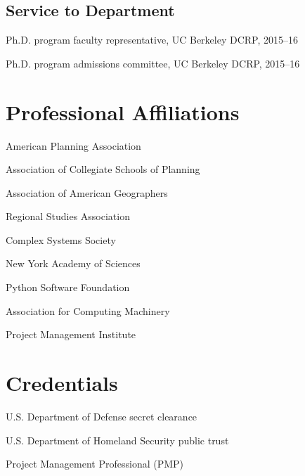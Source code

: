 \documentclass[12pt,letterpaper]{report}
\newcommand{\listitemspace}{0.15em}
\renewenvironment{itemize}
{\begin{list}{}{\setlength{\leftmargin}{0em}
				\setlength{\parskip}{0em}
				\setlength{\itemsep}{\listitemspace}
				\setlength{\parsep}{\listitemspace}}}
{\end{list}}
\begin{document}
\subsection*{Service to Department}

\begin{itemize}
	
\item Ph.D. program faculty representative, UC Berkeley DCRP, 2015--16

\item Ph.D. program admissions committee, UC Berkeley DCRP, 2015--16

\end{itemize}



\section*{Professional Affiliations}

\begin{itemize}
	
\item American Planning Association

\item Association of Collegiate Schools of Planning

\item Association of American Geographers

\item Regional Studies Association

\item Complex Systems Society

\item New York Academy of Sciences

\item Python Software Foundation

\item Association for Computing Machinery

\item Project Management Institute

\end{itemize}



\section*{Credentials}

\begin{itemize}
	
\item U.S. Department of Defense secret clearance

\item U.S. Department of Homeland Security public trust

\item Project Management Professional (PMP)

\end{itemize}
\end{document}
